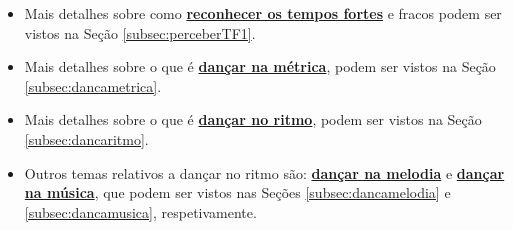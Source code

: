 \begin{tcbattention}
\begin{itemize}
\item Mais detalhes sobre como \hyperref[subsec:perceberTF1]{\textbf{reconhecer os tempos fortes}} 
e fracos podem ser vistos na Seção \ref{subsec:perceberTF1}.
\item Mais detalhes sobre o que é \hyperref[subsec:dancametrica]{\textbf{dançar na métrica}}, 
podem ser vistos na Seção \ref{subsec:dancametrica}.
\item Mais detalhes sobre o que é \hyperref[subsec:dancaritmo]{\textbf{dançar no ritmo}}, 
podem ser vistos na Seção \ref{subsec:dancaritmo}.
\item Outros temas relativos a dançar no ritmo são: 
\hyperref[subsec:dancamelodia]{\textbf{dançar na melodia}} e
\hyperref[subsec:dancamusica]{\textbf{dançar na música}},
que podem ser vistos nas Seções \ref{subsec:dancamelodia} e \ref{subsec:dancamusica},
respetivamente.
\end{itemize}
\end{tcbattention}


